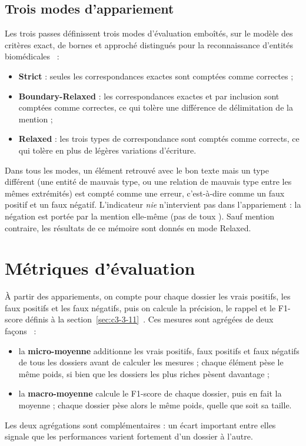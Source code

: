 \subsection{Trois modes d'appariement}

Les trois passes définissent trois modes d'évaluation emboîtés, sur le modèle des critères exact, de bornes et approché distingués pour la reconnaissance d'entités biomédicales~\cite{tsai2006criteria} :
\begin{itemize}
  \item \textbf{Strict} : seules les correspondances exactes sont comptées comme correctes ;
  \item \textbf{Boundary-Relaxed} : les correspondances exactes et par inclusion sont comptées comme correctes, ce qui tolère une différence de délimitation de la mention ;
  \item \textbf{Relaxed} : les trois types de correspondance sont comptés comme corrects, ce qui tolère en plus de légères variations d'écriture.
\end{itemize}
Dans tous les modes, un élément retrouvé avec le bon texte mais un type différent (une entité de mauvais type, ou une relation de mauvais type entre les mêmes extrémités) est compté comme une erreur, c'est-à-dire comme un faux positif et un faux négatif. L'indicateur \emph{nie} n'intervient pas dans l'appariement : la négation est portée par la mention elle-même (\og pas de toux \fg{}). Sauf mention contraire, les résultats de ce mémoire sont donnés en mode Relaxed.

\section{Métriques d'évaluation}\label{sec:c4-metriques}

À partir des appariements, on compte pour chaque dossier les vrais positifs, les faux positifs et les faux négatifs, puis on calcule la précision, le rappel et le F1-score définis à la section~\ref{sec:c3-3-11}~\cite{vanrijsbergen1979}. Ces mesures sont agrégées de deux façons~\cite{sokolova2009} :
\begin{itemize}
  \item la \textbf{micro-moyenne} additionne les vrais positifs, faux positifs et faux négatifs de tous les dossiers avant de calculer les mesures ; chaque élément pèse le même poids, si bien que les dossiers les plus riches pèsent davantage ;
  \item la \textbf{macro-moyenne} calcule le F1-score de chaque dossier, puis en fait la moyenne ; chaque dossier pèse alors le même poids, quelle que soit sa taille.
\end{itemize}
Les deux agrégations sont complémentaires : un écart important entre elles signale que les performances varient fortement d'un dossier à l'autre.

